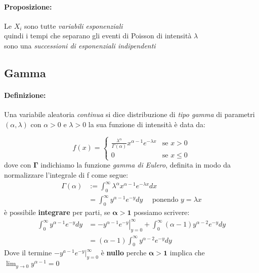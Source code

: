 \documentclass[]{article}
\newcommand{\definizione}{\paragraph{Definizione:}}
\begin{document}
    \paragraph{Proposizione:} Le $X_i$ sono tutte \textit{variabili esponenziali} \\
    quindi i tempi che separano gli eventi di Poisson di intensità $\lambda$ \\
    sono una \textit{successioni di esponenziali indipendenti} 

    \subsection{Gamma}
    \definizione Una variabile aleatoria \textit{continua} si dice distribuzione di \textit{tipo gamma}
    di parametri $(\alpha, \lambda)$ con $\alpha > 0$ e $\lambda > 0$ la sua funzione di intensità è data da:

    \begin{equation*}
        f(x) =
        \begin{cases}
            \frac{\lambda^\alpha}{\Gamma(\alpha)} x^{\alpha - 1} e^{-\lambda x} & \text{se } x > 0 \\
            0 & \text{se } x \leq 0 
        \end{cases}
    \end{equation*}
    dove con $\boldsymbol{\Gamma}$ indichiamo la funzione \textit{gamma di Eulero}, definita in modo da normalizzare l'integrale di f come segue:
    \begin{equation}
        \begin{aligned}
            \Gamma(\alpha) & :=\int_0^{\infty} \lambda^\alpha x^{\alpha-1} e^{-\lambda x} d x \\
            & =\int_0^{\infty} y^{\alpha-1} e^{-y} d y \quad \text { ponendo } y=\lambda x
        \end{aligned}
    \end{equation}
    è possibile \textbf{integrare} per parti, se $\boldsymbol{\alpha > 1}$ possiamo scrivere:
    \begin{equation}
        \begin{aligned}
            \int_0^{\infty} y^{\alpha-1} e^{-y} d y & =-\left.y^{\alpha-1} e^{-y}\right|_{y=0} ^{\infty}+\int_0^{\infty}(\alpha-1) y^{\alpha-2} e^{-y} d y \\
            & =(\alpha-1) \int_0^{\infty} y^{\alpha-2} e^{-y} d y
        \end{aligned}
    \end{equation}
    Dove il termine $-y^{a-1} e^{-y} \bigg\rvert_{y = 0}^{\infty}$ è \textbf{nullo} perche $\boldsymbol{\alpha > 1}$ implica che $\lim_{y \to 0} y^{\alpha - 1} = 0$
\end{document}
